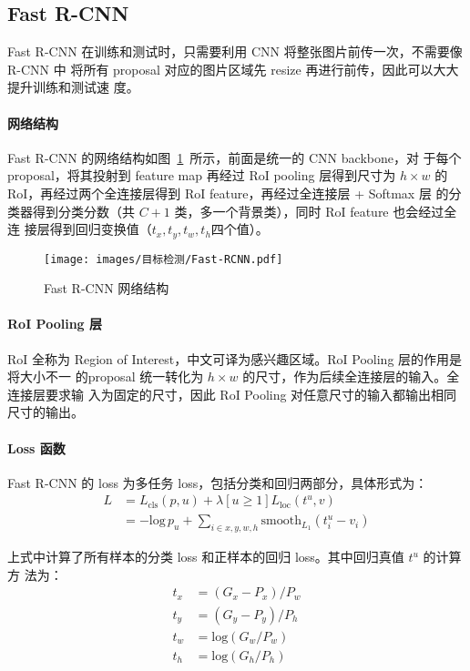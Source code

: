 \subsection{Fast R-CNN}
\label{subsec:Fast-R-CNN}

Fast R-CNN 在训练和测试时，只需要利用 CNN 将整张图片前传一次，不需要像 R-CNN 中
将所有 proposal 对应的图片区域先 resize 再进行前传，因此可以大大提升训练和测试速
度。

\paragraph{网络结构}
Fast R-CNN 的网络结构如图~\ref{fig:Fast-RCNN}~所示，前面是统一的 CNN backbone，对
于每个 proposal，将其投射到 feature map 再经过 RoI pooling 层得到尺寸为 $h
\times w$ 的 RoI，再经过两个全连接层得到 RoI feature，再经过全连接层 + Softmax 层
的分类器得到分类分数（共 $C+1$ 类，多一个背景类），同时 RoI feature 也会经过全连
接层得到回归变换值（$t_x, t_y, t_w, t_h$四个值）。

\begin{figure}[ht]
  \centering
  \texttt{[image: images/目标检测/Fast-RCNN.pdf]}
  \caption{Fast R-CNN 网络结构}
  \label{fig:Fast-RCNN}
\end{figure}

\paragraph{RoI Pooling 层}
RoI 全称为 Region of Interest，中文可译为感兴趣区域。RoI Pooling 层的作用是将大小不一
的proposal 统一转化为 $h \times w$ 的尺寸，作为后续全连接层的输入。全连接层要求输
入为固定的尺寸，因此 RoI Pooling 对任意尺寸的输入都输出相同尺寸的输出。

\paragraph{Loss 函数}
Fast R-CNN 的 loss 为多任务 loss，包括分类和回归两部分，具体形式为：
\begin{align}
  L & = L_{\mathrm{cls}}(p, u) + \lambda [u \geq 1] L_{\mathrm{loc}}(t^u, v) \\
    & = -\mathrm{log}\,p_u + \sum_{i \in {x, y, w, h}} \mathrm{smooth}_{L_1}(t_i^u - v_i)
\end{align}

上式中计算了所有样本的分类 loss 和正样本的回归 loss。其中回归真值 $t^u$ 的计算方
法为：
\begin{align}
  t_x & = (G_x - P_x) / P_w \\
  t_y & = (G_y - P_y) / P_h \\
  t_w & = \mathrm{log} (G_w/P_w) \\
  t_h & = \mathrm{log} (G_h/P_h)
\end{align}

